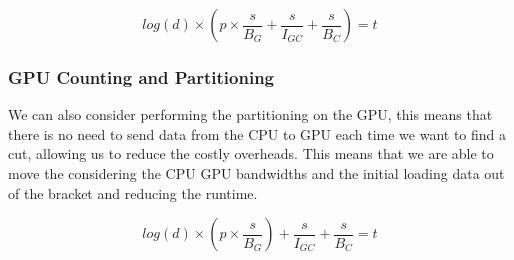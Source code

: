 \documentclass[]{article}
\begin{document}
\begin{center}
	\begin{equation}
			log(d) \times \left ( p \times \frac{s}{B_{G}} + \frac{s}{I_{GC}}  + \frac{s}{B_{C}} \right ) = t
		\label{eq:gpu}
	\end{equation}
\end{center}

\vspace{5mm}


\subsubsection{GPU Counting and Partitioning}\label{gpu-tree-building}

We can also consider performing the partitioning on the GPU, this means that there is no need to send data from the CPU to GPU each time we want to find a cut, allowing us to reduce the costly overheads. This means that we are able to move the considering the CPU GPU bandwidths and the initial loading data out of the bracket and reducing the runtime.

\begin{center}
	\begin{equation}
		log(d) \times \left ( p \times \frac{s}{B_{G}} \right ) + \frac{s}{I_{GC}} + \frac{s}{B_{C}} = t
		\label{eq:gputree}
	\end{equation}
\end{center}
\end{document}
